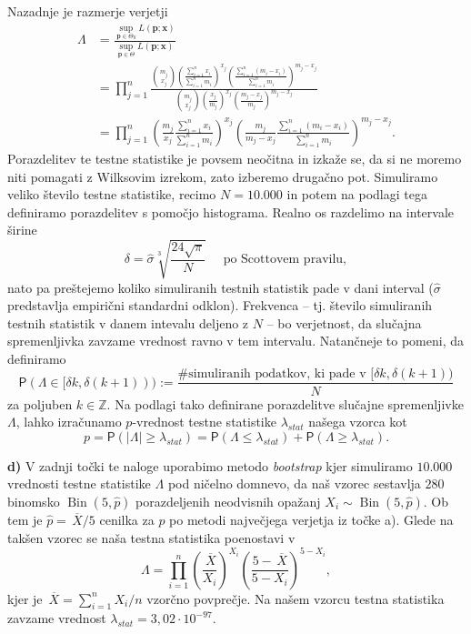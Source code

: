 \documentclass[a4paper,11pt]{article}
\newcommand{\olsi}[1]{\,\overline{\!{#1}}} %
\newcommand{\sumin}{\sum_{i = 1}^n}
\newcommand{\prob}{\mathsf{P}}
\newcommand{\Z}{\mathbb{Z}}
\DeclareMathOperator{\bin}{Bin}
\begin{document}
Nazadnje je razmerje verjetji
\begin{align*}
    \Lambda &= 
    \frac{\sup_{\bm{p} \in \Theta_0} L(\bm{p}; \bm{x})}{\sup_{\bm{p} \in \Theta} L(\bm{p}; \bm{x})}  \\ 
    &= \prod_{j = 1}^n
    \frac{\binom{m_j}{x_j} \left(\frac{\sumin x_i}{\sumin m_i}\right)^{x_j} \left(\frac{\sumin(m_i - x_i)}{\sumin m_i}\right)^{m_j - x_j}}{\binom{m_j}{x_j} \left(\frac{x_j}{m_j}\right)^{x_j} \left(\frac{m_j - x_j}{m_j}\right)^{m_j - x_j}} \\ &= 
    \prod_{j = 1}^n
    \left(\frac{m_j}{x_j} \frac{\sumin x_i}{\sumin m_i}\right)^{x_j}
    \left(\frac{m_j}{m_j - x_j}\frac{\sumin(m_i - x_i)}{\sumin m_i}\right)^{m_j - x_j}.
\end{align*}
Porazdelitev te testne statistike je povsem neočitna in izkaže se, da si ne moremo niti pomagati z Wilksovim izrekom, zato izberemo drugačno pot. Simuliramo veliko število testne statistike, recimo $N = 10.000$ in potem na podlagi tega definiramo porazdelitev s pomočjo histograma. Realno os razdelimo na intervale širine 
\[
    \delta = \hat{\sigma} \sqrt[3]{\frac{24\sqrt{\pi}}{N}} \quad \text{ po Scottovem pravilu},
\]  
nato pa preštejemo koliko simuliranih testnih statistik pade v dani interval ($\hat{\sigma}$ predstavlja empirični standardni odklon).  Frekvenca -- tj. število simuliranih testnih statistik v danem intevalu deljeno z $N$ -- bo verjetnost, da slučajna spremenljivka zavzame vrednost ravno v tem intervalu. Natančneje to pomeni, da definiramo
\[
    \prob(\Lambda \in [\delta k, \delta(k+1))) := \frac{\text{\# simuliranih podatkov, ki pade v $[\delta k, \delta(k+1))$}}{N}
\]
za poljuben $k \in \Z$. Na podlagi tako definirane porazdelitve slučajne spremenljivke $\Lambda$, lahko izračunamo $p$-vrednost testne statistike $\lambda_{stat}$ našega vzorca kot
\[
    p = \prob(\left\lvert \Lambda \right\rvert \geq \lambda_{stat}) = \prob(\Lambda \leq \lambda_{stat}) + \prob(\Lambda \geq \lambda_{stat}). 
\]

\noindent
\textbf{d) } V zadnji točki te naloge uporabimo metodo \emph{bootstrap} kjer simuliramo $10.000$ vrednosti testne statistike $\Lambda$ pod ničelno domnevo, da naš vzorec sestavlja $280$ binomsko $\bin(5, \hat{p})$ porazdeljenih neodvisnih opažanj $X_i \sim \bin(5, \hat{p})$. Ob tem je $\hat{p} = \olsi{X}/5$ cenilka za $p$ po metodi največjega verjetja iz točke a). Glede na takšen vzorec se naša testna statistika poenostavi v 
\[
    \Lambda = \prod_{i = 1}^n \left(\frac{\olsi{X}}{X_i}\right)^{X_i} \left( \frac{5 - \olsi{X}}{5 - X_i}\right)^{5 - X_i},
\]
kjer je $\olsi{X} = \sumin X_i/n$ vzorčno povprečje. Na našem vzorcu testna statistika zavzame vrednost $\lambda_{stat} = 3,02 \cdot 10^{-97}$.
\end{document}
